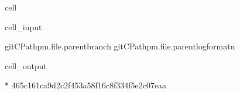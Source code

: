 \documentclass[letterpaper,table,10pt,english]{jupyterBook}
\begin{document}
\begin{sphinxuseclass}{cell}\begin{sphinxVerbatimInput}

\begin{sphinxuseclass}{cell_input}
\begin{sphinxVerbatim}[commandchars=\\\{\}]
git\PYGZhy{}CPathpm.\PYGZus{}\PYGZus{}file\PYGZus{}\PYGZus{}.parentbranch
git\PYGZhy{}CPathpm.\PYGZus{}\PYGZus{}file\PYGZus{}\PYGZus{}.parentlog\PYGZhy{}\PYGZhy{}format\PYGZhy{}n
\end{sphinxVerbatim}

\end{sphinxuseclass}\end{sphinxVerbatimInput}
\begin{sphinxVerbatimOutput}

\begin{sphinxuseclass}{cell_output}
\begin{sphinxVerbatim}[commandchars=\\\{\}]
* 
465c161ca9d2c2f453a58f16c8f334f5e2c07eaa
\end{sphinxVerbatim}

\end{sphinxuseclass}\end{sphinxVerbatimOutput}

\end{sphinxuseclass}
\end{document}
